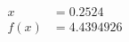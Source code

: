 \documentclass[preview]{standalone}
\begin{document}
\begin{align*}
x &= 0.2524\\f(x) &= 4.4394926
\end{align*}
\end{document}

